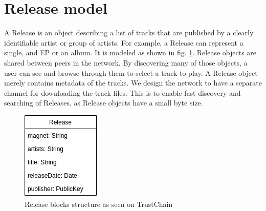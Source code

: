 \section{Release model}
\label{sec:release-model}
A Release is an object describing a list of tracks that are published by a clearly identifiable artist or group of artists. For example, a Release can represent a single, and EP or an album. It is modeled as shown in fig. \ref{fig:release-model}. Release objects are shared between peers in the network. By discovering many of those objects, a user can see and browse through them to select a track to play. A Release object merely contains metadata of the tracks. We design the network to have a separate channel for downloading the track files. This is to enable fast discovery and
searching of Releases, as Release objects have a small byte size. 
\begin{figure}
        \includegraphics[width=\linewidth]{design/release-model.png}
        \caption{Release blocks structure as seen on TrustChain}
        \label{fig:release-model}
    \endminipage\hfill

\end{figure}
